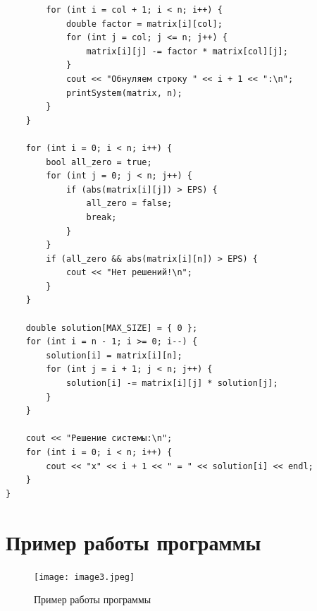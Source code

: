 \documentclass[a4paper,12pt]{article}
\begin{document}
\begin{verbatim}
        for (int i = col + 1; i < n; i++) {
            double factor = matrix[i][col];
            for (int j = col; j <= n; j++) {
                matrix[i][j] -= factor * matrix[col][j];
            }
            cout << "Обнуляем строку " << i + 1 << ":\n";
            printSystem(matrix, n);
        }
    }
    
    for (int i = 0; i < n; i++) {
        bool all_zero = true;
        for (int j = 0; j < n; j++) {
            if (abs(matrix[i][j]) > EPS) {
                all_zero = false;
                break;
            }
        }
        if (all_zero && abs(matrix[i][n]) > EPS) {
            cout << "Нет решений!\n";
        }
    }
    
    double solution[MAX_SIZE] = { 0 };
    for (int i = n - 1; i >= 0; i--) {
        solution[i] = matrix[i][n];
        for (int j = i + 1; j < n; j++) {
            solution[i] -= matrix[i][j] * solution[j];
        }
    }
    
    cout << "Решение системы:\n";
    for (int i = 0; i < n; i++) {
        cout << "x" << i + 1 << " = " << solution[i] << endl;
    }
}
\end{verbatim}

\section{Пример работы программы}
\begin{figure}[H]
\centering
\texttt{[image: image3.jpeg]}
\caption{Пример работы программы}
\end{figure}
\end{document}
